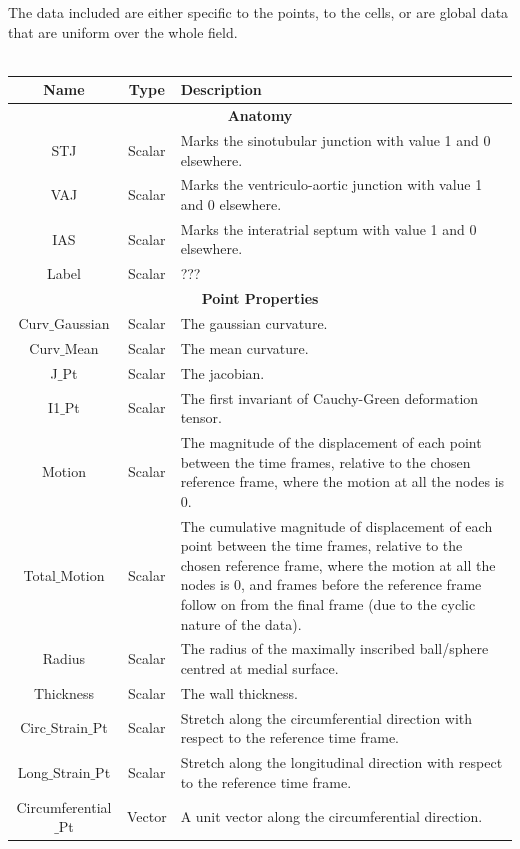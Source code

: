 \documentclass{article}
\begin{document}
The data included are either specific to the points, to the cells, or are global data that are uniform over the whole field.
\\
~
\\
\begin{tabular}{|c|c|p{9.4cm}|}
	\hline
\textbf{Name}	& \textbf{Type} & \textbf{Description}   \\
	\hline
	\hline
	\multicolumn{3}{|c|}{\textbf{Anatomy}} \\
	\hline
STJ	& Scalar  & Marks the sinotubular junction with value 1 and 0 elsewhere.  \\
	\hline
VAJ	& Scalar &  Marks the ventriculo-aortic junction with value 1 and 0 elsewhere.  \\
	\hline 
IAS	&Scalar &Marks the interatrial septum with value 1 and 0 elsewhere. \\
	\hline
Label	& Scalar & ???\\
\hline
\hline
\multicolumn{3}{|c|}{\textbf{Point Properties}} \\
	\hline
Curv$\_$Gaussian	& Scalar& The gaussian curvature.\\
\hline
Curv$\_$Mean	& Scalar& The mean curvature.\\
	\hline
J$\_$Pt	& Scalar& The jacobian.\\
	\hline
I1$\_$Pt& Scalar & The first invariant of Cauchy-Green deformation tensor. \\
	\hline
Motion	& Scalar& The magnitude of the displacement of each point between the time frames, relative to the chosen reference frame, where the motion at all the nodes is 0.\\
	\hline
Total$\_$Motion	& Scalar& The cumulative magnitude of displacement of each point between the time frames, relative to the chosen reference frame, where the motion at all the nodes is 0, and frames before the reference frame follow on from the final frame (due to the cyclic nature of the data).\\
	\hline
Radius	&Scalar & The radius of the maximally inscribed ball/sphere centred at medial surface.\\
\hline
Thickness	&Scalar & The wall thickness.\\
	\hline
Circ$\_$Strain$\_$Pt	& Scalar & Stretch along the circumferential direction with respect to the reference time frame.\\
\hline
Long$\_$Strain$\_$Pt	& Scalar & Stretch along the longitudinal direction with respect to the reference time frame.\\
	\hline
Circumferential$\_$Pt	& Vector & A unit vector along the circumferential direction. \\

\end{tabular}
\end{document}
